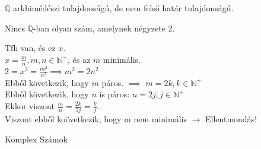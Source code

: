 \begin{frame}
\begin{tcolorbox}[title={Tétel: Q nem felső határ tulajdonságú}]
$\mathbb{Q}$ arkhimédészi tulajdonságú, de nem felső határ tulajdonságú.
\end{tcolorbox}
\end{frame}


\begin{frame}
\begin{tcolorbox}[title={Tétel: $\sqrt{2}$ nem racionális}]
Nincs $\mathbb{Q}$-ban olyan szám, amelynek négyzete 2.
\end{tcolorbox}

\begin{tcolorbox}[title={Bizonyítás (Indirekt)}]
Tfh van, és ez $x$.\\
$x = \frac{m}{n}, m,n \in \mathbb{N}^+$, és az $m$ minimális.\\
$2 = x^2 = \frac{m^2}{n^2} \implies m^2 = 2n^2$\\
Ebből következik, hogy $m$ páros. $\implies$ $m = 2k, k \in \mathbb{N}^+$\\
Ebből következik, hogy $n$ is páros: $n = 2j, j \in \mathbb{N}^+$\\
Ekkor viszont $\frac{m}{n} = \frac{2k}{2j} = \frac{k}{j}$.\\
Viszont ebből koövetkezik, hogy m nem minimális $\rightarrow$ Ellentmondás!
\end{tcolorbox}
\end{frame}

\begin{frame}
\begin{tcolorbox}[title={Def.: Valós számok halmaza}]
\end{tcolorbox}

\begin{tcolorbox}[title={Def.: néhány Függvény (?)}]
\end{tcolorbox}
\end{frame}

\begin{frame}
\begin{tcolorbox}[title={Def.: Bővített valós számok}]
\end{tcolorbox}
\end{frame}

\begin{frame}
\begin{tcolorbox}
{\Huge Komplex Számok}
\end{tcolorbox}
\end{frame}

